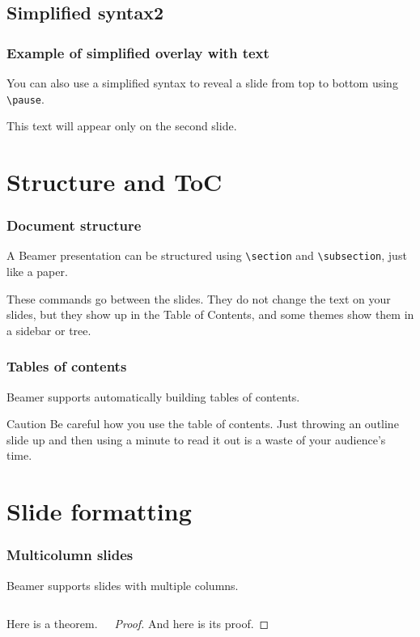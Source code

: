 \documentclass{beamer}
\begin{document}
\subsection{Simplified syntax2}
\begin{frame}[fragile]
  \frametitle{Example of simplified overlay with text}
  You can also use a simplified syntax to reveal a slide from top to bottom using \verb|\pause|.

  \pause

  This text will appear only on the second slide.
\end{frame}

\section{Structure and ToC}
\begin{frame}[fragile]
  \frametitle{Document structure}
  A Beamer presentation can be structured using \verb|\section| and \verb|\subsection|, just like a paper.

  These commands go \alert{between} the slides.
  They do not change the text on your slides, but they show up in the Table of Contents, and some themes show them in a sidebar or tree.
\end{frame}

\begin{frame}
  \frametitle{Tables of contents}
  Beamer supports automatically building tables of contents.

  \begin{alertblock}{Caution}
    Be careful how you use the table of contents.
    Just throwing an outline slide up and then using a minute to read it out is a waste of your audience's time.
  \end{alertblock}
\end{frame}

\section{Slide formatting}
\begin{frame}
  \frametitle{Multicolumn slides}
  Beamer supports slides with multiple columns.

  \begin{columns}
    \begin{theorem}
      Here is a theorem.
    \end{theorem}

    \begin{proof}
      And here is its proof.
    \end{proof}
  \end{columns}
\end{frame}
\end{document}
